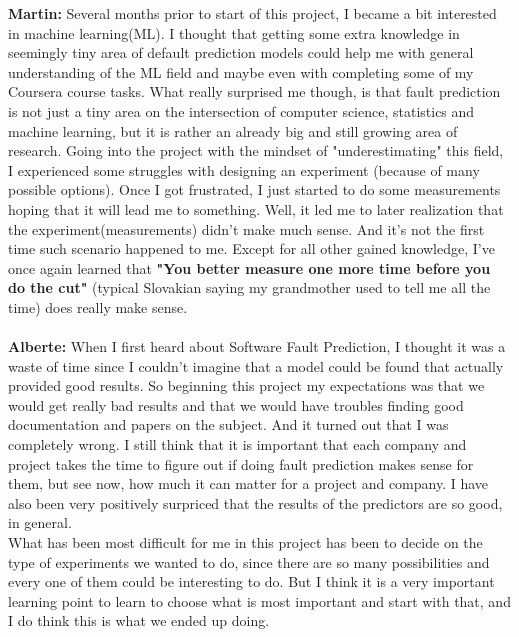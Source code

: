 \textbf{Martin:} Several months prior to start of this project, I became a bit interested in machine learning(ML). I thought that getting some extra knowledge in seemingly tiny area of default prediction models could help me with general understanding of the ML field and maybe even with completing some of my Coursera course tasks. What really surprised me though, is that fault prediction is not just a tiny area on the intersection of computer science, statistics and machine learning, but it is rather an already big and still growing area of research. Going into the project with the mindset of "underestimating" this field, I experienced some struggles with designing an experiment (because of many possible options). Once I got frustrated, I just started to do some measurements hoping that it will lead me to something. Well, it led me to later realization that the experiment(measurements) didn't make much sense. And it's not the first time such scenario happened to me. Except for all other gained knowledge, I've once again learned that \textbf{"You better measure one more time before you do the cut"} (typical Slovakian saying my grandmother used to tell me all the time) does really make sense.\\\\
\textbf{Alberte:} When I first heard about Software Fault Prediction, I thought it was a waste of time since I couldn't imagine that a model could be found that actually provided good results. So beginning this project my expectations was that we would get really bad results and that we would have troubles finding good documentation and papers on the subject. And it turned out that I was completely wrong. I still think that it is important that each company and project takes the time to figure out if doing fault prediction makes sense for them, but see now, how much it can matter for a project and company. I have also been very positively surpriced that the results of the predictors are so good, in general. \\ What has been most difficult for me in this project has been to decide on the type of experiments we wanted to do, since there are so many possibilities and every one of them could be interesting to do. But I think it is a very important learning point to learn to choose what is most important and start with that, and I do think this is what we ended up doing. 